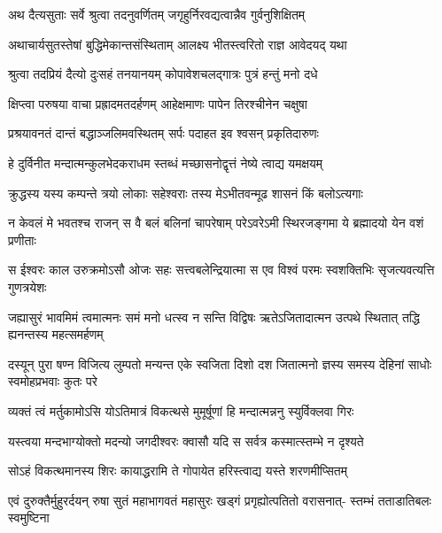 


\twolineshloka
{अथ दैत्यसुताः सर्वे श्रुत्वा तदनुवर्णितम्}
{जगृहुर्निरवद्यत्वान्नैव गुर्वनुशिक्षितम्} %

\twolineshloka
{अथाचार्यसुतस्तेषां बुद्धिमेकान्तसंस्थिताम्}
{आलक्ष्य भीतस्त्वरितो राज्ञ आवेदयद् यथा} %

\twolineshloka
{श्रुत्वा तदप्रियं दैत्यो दुःसहं तनयानयम्}
{कोपावेशचलद्गात्रः पुत्रं हन्तुं मनो दधे} %

\twolineshloka
{क्षिप्त्वा परुषया वाचा प्रह्रादमतदर्हणम्}
{आहेक्षमाणः पापेन तिरश्चीनेन चक्षुषा} %

\twolineshloka
{प्रश्रयावनतं दान्तं बद्धाञ्जलिमवस्थितम्}
{सर्पः पदाहत इव श्वसन् प्रकृतिदारुणः} %



\twolineshloka
{हे दुर्विनीत मन्दात्मन्कुलभेदकराधम}
{स्तब्धं मच्छासनोद्वृत्तं नेष्ये त्वाद्य यमक्षयम्} %

\twolineshloka
{क्रुद्धस्य यस्य कम्पन्ते त्रयो लोकाः सहेश्वराः}
{तस्य मेऽभीतवन्मूढ शासनं किं बलोऽत्यगाः} %



\fourlineindentedshloka
{न केवलं मे भवतश्च राजन्}
{स वै बलं बलिनां चापरेषाम्}
{परेऽवरेऽमी स्थिरजङ्गमा ये}
{ब्रह्मादयो येन वशं प्रणीताः} %

\fourlineindentedshloka
{स ईश्वरः काल उरुक्रमोऽसौ}
{ओजः सहः सत्त्वबलेन्द्रियात्मा}
{स एव विश्वं परमः स्वशक्तिभिः}
{सृजत्यवत्यत्ति गुणत्रयेशः} %

\fourlineindentedshloka
{जह्यासुरं भावमिमं त्वमात्मनः}
{समं मनो धत्स्व न सन्ति विद्विषः}
{ऋतेऽजितादात्मन उत्पथे स्थितात्}
{तद्धि ह्यनन्तस्य महत्समर्हणम्} %

\fourlineindentedshloka
{दस्यून् पुरा षण्न विजित्य लुम्पतो}
{मन्यन्त एके स्वजिता दिशो दश}
{जितात्मनो ज्ञस्य समस्य देहिनां}
{साधोः स्वमोहप्रभवाः कुतः परे} %



\twolineshloka
{व्यक्तं त्वं मर्तुकामोऽसि योऽतिमात्रं विकत्थसे}
{मुमूर्षूणां हि मन्दात्मन्ननु स्युर्विक्लवा गिरः} %

\twolineshloka
{यस्त्वया मन्दभाग्योक्तो मदन्यो जगदीश्वरः}
{क्वासौ यदि स सर्वत्र कस्मात्स्तम्भे न दृश्यते} %

\twolineshloka
{सोऽहं विकत्थमानस्य शिरः कायाद्धरामि ते}
{गोपायेत हरिस्त्वाद्य यस्ते शरणमीप्सितम्} %

\fourlineindentedshloka
{एवं दुरुक्तैर्मुहुरर्दयन् रुषा}
{सुतं महाभागवतं महासुरः}
{खड्गं प्रगृह्योत्पतितो वरासनात्-}
{स्तम्भं तताडातिबलः स्वमुष्टिना} %

